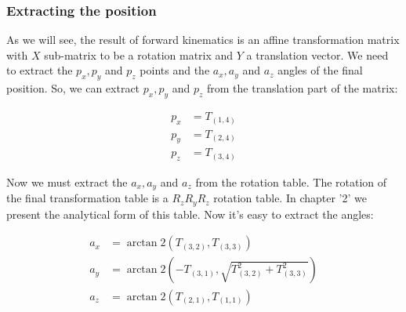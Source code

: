 \subsubsection*{Extracting the position}
As we will see, the result of forward kinematics is an affine transformation matrix with $X$ sub-matrix to be a rotation matrix and $Y$ a translation vector. We need to extract the $p_x,p_y$ and $p_z$ points and the $a_x,a_y$ and $a_z$ angles of the final position. So, we can extract $p_x,p_y$ and $p_z$ from the translation part of the matrix:
\begin{small}
\begin{align*}
p_x &= T_{(1,4)}\\
p_y &= T_{(2,4)}\\
p_z &= T_{(3,4)}
\end{align*}
\end{small}
Now we must extract the $a_x,a_y$ and $a_z$ from the rotation table. The rotation of the final transformation table is a $R_zR_yR_z$ rotation table. In chapter '2' we present the analytical form of this table. Now it's easy to extract the angles:
\begin{small}
\begin{align*}
a_x &= \arctan2\left(T_{(3,2)},T_{(3,3)}\right)\\
a_y &= \arctan2\left(-T_{(3,1)},\sqrt{T^2_{(3,2)} + T^2_{(3,3)}}\right)\\
a_z &= \arctan2\left(T_{(2,1)},T_{(1,1)}\right)
\end{align*}
\end{small}

